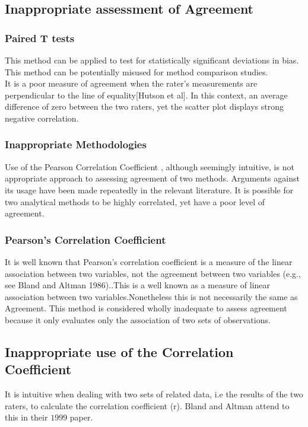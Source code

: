 \documentclass[12pt, a4paper]{report}
\theoremstyle{plain}
\theoremstyle{definition}
\theoremstyle{remark}
\begin{document}
	\subsection{Inappropriate assessment of Agreement}
	\subsubsection{Paired T tests} This method can be applied to test for
	statistically significant deviations in bias. This method can be
	potentially misused for method comparison studies.
	\\It is a poor measure of agreement when the rater's measurements
	are perpendicular to the line of equality[Hutson et al]. In this
	context, an average difference of zero between the two raters, yet
	the scatter plot displays strong negative correlation.
	\subsubsection{Inappropriate Methodologies} Use of the Pearson
	Correlation Coefficient , although seemingly intuitive, is not
	appropriate approach to assessing agreement of two methods.
	Arguments against its usage have been made repeatedly in the
	relevant literature. It is possible for two analytical methods to
	be highly correlated, yet have a poor level of agreement.
	\subsubsection{Pearson's Correlation Coefficient} It is well known that
	Pearson's correlation coefficient is a measure of the linear
	association between two variables, not the agreement between two
	variables (e.g., see Bland and Altman 1986)..This is a well known
	as a measure of linear association between two
	variables.Nonetheless this is not necessarily the same as
	Agreement. This method is considered wholly inadequate to assess
	agreement because it only evaluates only the association of two
	sets of observations.
	
	\subsection{Inappropriate use of the Correlation Coefficient}
	It is intuitive when dealing with two sets of related data, i.e
	the results of the two raters,  to calculate the correlation
	coefficient (r). Bland and Altman attend to this in their $1999$
	paper.
	
\end{document}
